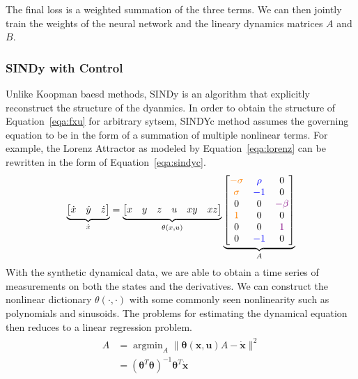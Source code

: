 \documentclass[10pt,twocolumn]{article}
\DeclareMathOperator*{\argmin}{argmin}
\begin{document}
The final loss is a weighted summation of the three terms. We can then jointly train the
weights of the neural network and the lineary dynamics matrices $A$ and $B$.

\subsubsection{SINDy with Control \cite{sindyc}}
Unlike Koopman baesd methods, SINDy is an algorithm that explicitly reconstruct the
structure of the dyanmics. In order to obtain the structure of Equation~\ref{eqa:fxu}
for arbitrary sytsem,
SINDYc method assumes the governing equation to be in the form of a summation of
multiple nonlinear terms. For example, the Lorenz Attractor as modeled by
Equation~\ref{eqa:lorenz} can be rewritten in the form of Equation~\ref{eqa:sindyc}.
\begin{gather}\label{eqa:lorenz_sindy}
  \underbrace{
    \begin{bmatrix}
      \dot{x} & \dot{y} & \dot{z}
    \end{bmatrix}
  }_{\dot{x}}
  =
  \underbrace{
    \begin{bmatrix}
      x & y & z & u & xy & xz
    \end{bmatrix}
  }_{\theta(x, u)}
  \underbrace{
    \begin{bmatrix}
      {\color{orange}-\sigma} & {\color{blue}\rho} & 0 \\
      {\color{orange}\sigma} & {\color{blue}-1} & 0 \\
      0 & 0 & {\color{violet}-\beta} \\
      {\color{orange}1} & 0 & 0 \\
      0 & 0 & {\color{violet}1} \\
      0 & {\color{blue}-1} & 0
    \end{bmatrix}
  }_{A}
\end{gather}
With the synthetic dynamical data, we are able to obtain a time series of measurements
on both the states and the derivatives. We can construct the nonlinear dictionary
$\theta(\cdot, \cdot)$ with some commonly seen nonlinearity such as polynomials and
sinusoids. The problems for estimating the dynamical equation then reduces to a
linear regression problem.
\begin{gather}
  \begin{aligned}
    A &=  \argmin_A \| \bm{\theta}(\bm{x}, \bm{u})A - \dot{\bm{x}} \|^2 \\
      &= (\bm{\theta}^T \bm{\theta})^{-1}\bm{\theta}^T \dot{\bm{x}}
  \end{aligned}
\end{gather}
\end{document}
